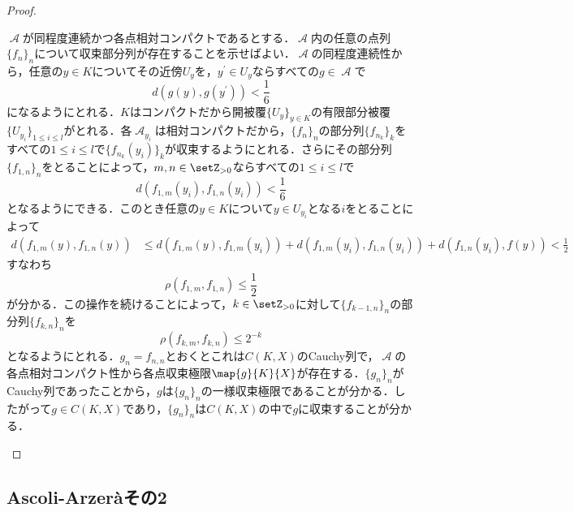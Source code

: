 \documentclass[uplatex]{jsarticle}
\begin{document}
\begin{proof}
\begin{subproof}{}
$\mscrA$が同程度連続かつ各点相対コンパクトであるとする．$\mscrA$内の任意の点列$\{f_n\}_n$について収束部分列が存在することを示せばよい．$\mscrA$の同程度連続性から，任意の$y\in K$についてその近傍$U_y$を，$y^\prime\in U_y$ならすべての$g\in \mscrA$で
\[ d(g(y),g(y^\prime)) < \frac{1}{6} \]
になるようにとれる．$K$はコンパクトだから開被覆$\{U_y\}_{y\in K}$の有限部分被覆$\{U_{y_i}\}_{1\leq i\leq l}$がとれる．各$\mscrA_{y_i}$は相対コンパクトだから，$\{f_n\}_n$の部分列$\{f_{n_k}\}_k$をすべての$1\leq i\leq l$で$\{f_{n_k}(y_i)\}_k$が収束するようにとれる．さらにその部分列$\{f_{1,n}\}_n$をとることによって，$m,n\in \setZ_{>0}$ならすべての$1\leq i\leq l$で
\[ d(f_{1,m}(y_i),f_{1,n}(y_i)) < \frac{1}{6} \]
となるようにできる．このとき任意の$y\in K$について$y\in U_{y_i}$となる$i$をとることによって
\begin{align*}
d(f_{1,m}(y),f_{1,n}(y)) &\leq d(f_{1,m}(y),f_{1,m}(y_i)) + d(f_{1,m}(y_i),f_{1,n}(y_i)) + d(f_{1,n}(y_i),f(y)) < \frac{1}{2}
\end{align*}
すなわち
\[ \rho(f_{1,m},f_{1,n}) \leq \frac{1}{2} \]
が分かる．この操作を続けることによって，$k\in \setZ_{>0}$に対して$\{f_{k-1,n}\}_n$の部分列$\{f_{k,n}\}_n$を
\[ \rho(f_{k,m},f_{k,n})\leq 2^{-k} \]
となるようにとれる．$g_n=f_{n,n}$とおくとこれは$C(K,X)$のCauchy列で，$\mscrA$の各点相対コンパクト性から各点収束極限$\map{g}{K}{X}$が存在する．$\{g_n\}_n$がCauchy列であったことから，$g$は$\{g_n\}_n$の一様収束極限であることが分かる．したがって$g\in C(K,X)$であり，$\{g_n\}_n$は$C(K,X)$の中で$g$に収束することが分かる．
\end{subproof}
\end{proof}

\subsection{Ascoli-Arzer\`{a}その2}
\end{document}
